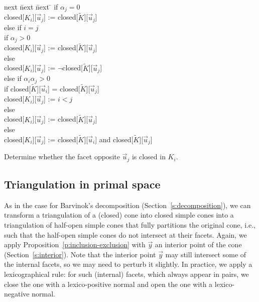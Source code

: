 \begin{algorithm}
\begin{tabbing}
next \= next \= next \= \kill
if $\alpha_j = 0$ \\
\> closed[$K_i$][$\vec u_j$] := closed[$\tilde K$][$\vec u_j$] \\
else if $i = j$ \\
\> if $\alpha_j > 0$ \\
\> \> closed[$K_i$][$\vec u_j$] := closed[$\tilde K$][$\vec u_j$] \\
\> else \\
\> \> closed[$K_i$][$\vec u_j$] := $\lnot$closed[$\tilde K$][$\vec u_j$] \\
else if $\alpha_i \alpha_j > 0$ \\
\> if closed[$\tilde K$][$\vec u_i$] = closed[$\tilde K$][$\vec u_j$] \\
\> \> closed[$K_i$][$\vec u_j$] := $i < j$ \\
\> else \\
\> \> closed[$K_i$][$\vec u_j$] := closed[$\tilde K$][$\vec u_j$] \\
else \\
\> closed[$K_i$][$\vec u_j$] := closed[$\tilde K$][$\vec u_i$] and
closed[$\tilde K$][$\vec u_j$]
\end{tabbing}
\caption{Determine whether the facet opposite $\vec u_j$ is closed in $K_i$.}
\label{alg:closed}
\end{algorithm}

\subsection{Triangulation in primal space}
\label{s:triangulation}

As in the case for Barvinok's decomposition (Section~\ref{s:decomposition}),
we can transform a triangulation of a (closed) cone into closed simple cones
into a triangulation of half-open simple cones that fully partitions the
original cone, i.e., such that the half-open simple cones do not intersect at their
facets.
Again, we apply Proposition~\ref{p:inclusion-exclusion} with $\vec y$
an interior point of the cone (Section~\ref{s:interior}).
Note that the interior point $\vec y$ may still intersect
some of the internal facets, so we may need to perturb it slightly.
In practice, we apply a lexicographical rule: for such (internal)
facets, which always appear in pairs, we close the one with
a lexico-positive normal and open the one with a lexico-negative
normal.

